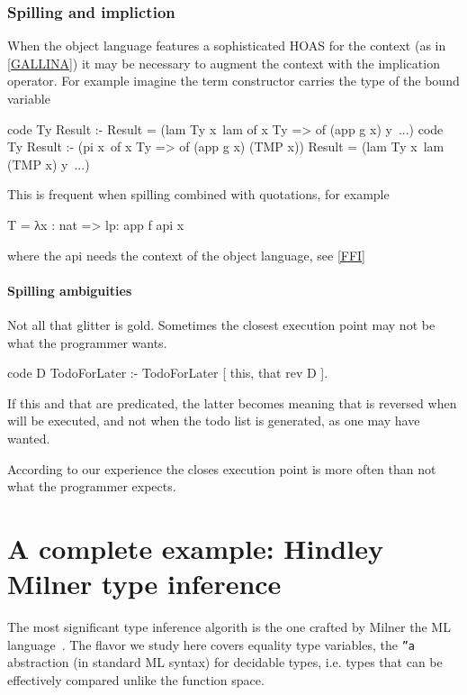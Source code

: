 \documentclass[a4paper, 11pt]{book}
\begin{document}
\subsubsection{Spilling and impliction}

When the object language features a sophisticated HOAS for the context
(as in \ref{GALLINA}) it may be necessary to augment the context with
the implication operator. For example imagine the 
term constructor carries the type of the bound variable

\begin{elpicode}
  code Ty Result :- Result = (lam Ty x\ lam {of x Ty => of (app g x)} y\ ...)
  code Ty Result :-
    (pi x\ of x Ty => of (app g x) (TMP x))
    Result = (lam Ty x\ lam (TMP x) y\ ...)
\end{elpicode}

This is frequent when spilling combined with quotations, for example

\begin{elpicode}
  T = {{ λx : nat => lp:{{ app f {api x}  }}  }}
\end{elpicode}

where the api needs the context of the object language, see \ref{FFI}

\paragraph{Spilling ambiguities}

Not all that glitter is gold. Sometimes the closest execution
point may not be what the programmer wants.

\begin{elpicode}
  code D TodoForLater  :-
    TodoForLater [ this, that {rev D} ].
\end{elpicode}

If this and that are predicated, the latter becomes
 meaning that
 is reversed when  will be executed, and
not when the todo list is generated, as one may have wanted.

According to our experience the closes execution point
is more often than not what the programmer expects.

\section{A complete example: Hindley Milner type inference}\label{sec:milner}

The most significant type inference algorith is the one crafted by
Milner the ML language~\cite{MILNER1978348}. The flavor we 
study here covers equality type variables, the \texttt{''a} abstraction
(in standard ML syntax) for decidable types, i.e. types that can be
effectively compared unlike the function space.
\end{document}
